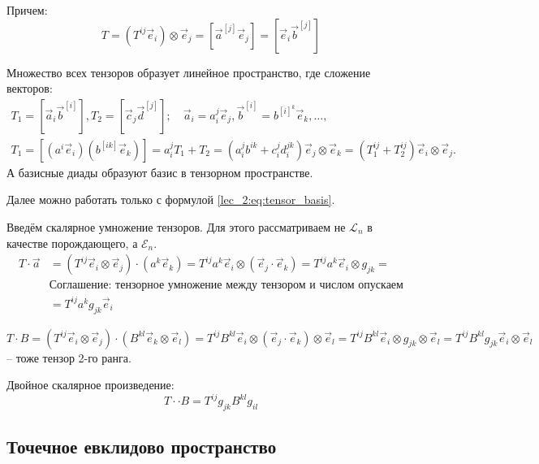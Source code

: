 \begin{definition}
\begin{enumerate}
\begin{theorem}
      Причем:
      \[
        T = (T^{ij} \vec{e}_i) \otimes \vec{e}_j
        = [\vec{a}^{[j]} \vec{e}_j]
        = [\vec{e}_i \vec{b}^{[j]}]
      \]
    \end{theorem}
    \begin{theorem}[Следствие]
      Множество всех тензоров образует линейное пространство, где сложение векторов:
      \begin{multline*}
        T_1 = [\vec{a}_i \vec{b}^{[i]}],
        T_2 = [\vec{c}_j \vec{d}^{[j]}]; \quad
        \vec{a}_i = a^j_i \vec{e}_j,
        \vec{b}^{[i]} = b^{[i]}^k \vec{e}_k,
        \dots, \quad \\
        T_1 = [(a^i \vec{e}_i) (b^{[ik]} \vec{e}_k)] = a^j_i 
        T_1+T_2 = (a^j_i b^{ik} + c^{j}_i d^{jk}_i) \vec{e}_j \otimes \vec{e}_k
        = (T_1^{ij} + T_2^{ij}) \vec{e}_i \otimes \vec{e}_j.
      \end{multline*}
      А базисные диады образуют базис в тензорном пространстве.
    \end{theorem}
  \end{enumerate}
\end{definition}

Далее можно работать только с формулой \eqref{lec_2:eq:tensor_basis}.

Введём скалярное умножение тензоров. Для этого рассматриваем не $\mathcal{L}_n$ в качестве
порождающего, а $\mathcal{E}_n$.
\begin{align*}
  T \cdot \vec{a} &= (T^{ij} \vec{e}_i \otimes \vec{e}_j) \cdot (a^k \vec{e}_k)
  = T^{ij} a^k \vec{e}_i \otimes (\vec{e}_j \cdot \vec{e}_k)
  = T^{ij} a^k \vec{e}_i \otimes g_{jk} = \\
  &\text{Соглашение: тензорное умножение между тензором и числом опускаем} \\
  &= T^{ij} a^k g_{jk} \vec{e}_i
\end{align*}

\[
  T \cdot B = (T^{ij} \vec{e}_i \otimes \vec{e}_j) \cdot (B^{kl} \vec{e}_k \otimes \vec{e}_l)
  = T^{ij} B^{kl} \vec{e}_i \otimes (\vec{e}_j \cdot \vec{e}_k) \otimes \vec{e}_l
  = T^{ij} B^{kl} \vec{e}_i \otimes g_{jk} \otimes \vec{e}_l
  = T^{ij} B^{kl} g_{jk} \vec{e}_i \otimes \vec{e}_l
\]
-- тоже тензор 2-го ранга.

Двойное скалярное произведение:
\[
  T \cdot \cdot B = T^{ij} g_{jk} B^{kl} g_{il}
\]

\subsection{Точечное евклидово пространство}

